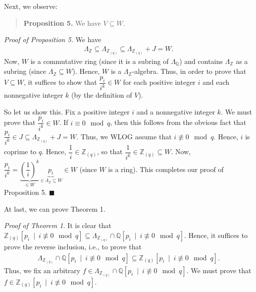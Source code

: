 \documentclass[10pt,a4paper]{article}
\begin{document}
Next, we observe:



\begin{quote}



\textbf{Proposition 5.} We have $V\subseteq W$.



\end{quote}



\emph{Proof of Proposition 5.} We have
\begin{align}
\Lambda
_{\mathbb{Z}}\subseteq \Lambda
_{\mathbb{Z}_{\left(  q\right)  }}\subseteq \Lambda_{\mathbb{Z}_{\left(
q\right)  }}+J=W .
\end{align}
Now, $W$ is a commutative ring (since it is a subring of $\Lambda_{\mathbb{Q}}$) and contains
$\Lambda_{\mathbb{Z}}$ as a subring (since $\Lambda
_{\mathbb{Z}}\subseteq W$). Hence, $W$ is a $\Lambda_{\mathbb{Z}}$-algebra. Thus, in order to prove that $V\subseteq W$, it suffices to show
that $\dfrac{p_{i}}{i^{k}}\in W$ for each positive integer $i$ and each
nonnegative integer $k$ (by the definition of $V$).




So let us show this. Fix a positive integer $i$ and a nonnegative integer $k$. We must prove that $\dfrac{p_{i}}{i^{k}}\in W$. If $i\equiv0\mod q$,
then this follows from the obvious fact that $\dfrac{p_{i}}{i^{k}}\in
J\subseteq\Lambda_{\mathbb{Z}_{\left(  q\right)  }}+J=W$. Thus, we WLOG assume that $i\not \equiv 0\mod q$. Hence, $i$ is coprime to $q$. Hence, $\dfrac{1}{i}\in \mathbb{Z}_{\left(  q\right)  }$, so that $\dfrac{1}{i^{k}}\in\mathbb{Z}_{\left(  q\right)  }\subseteq W$. Now, $\dfrac{p_{i}}{i^{k}} =\underbrace{\left(  \dfrac{1}{i}\right)  ^{k}}_{\in W} \underbrace{p_{i}}_{\in \Lambda_{\mathbb{Z}} \subseteq W}\in W$ (since $W$ is a ring). This completes our proof of Proposition 5.
$\blacksquare$




At last, we can prove Theorem 1.




\emph{Proof of Theorem 1.} It is clear that $\mathbb{Z}_{\left(  q\right)  }\left[ p_{i}\ \mid\ i\not \equiv 0\mod q\right]  \subseteq
\Lambda_{\mathbb{Z}_{\left(  q\right)  }}\cap\mathbb{Q}\left[  p_{i}
\ \mid\ i\not \equiv 0\mod q\right]  $. Hence, it suffices to
prove the reverse inclusion, i.e., to prove that
\begin{align*}
\Lambda_{\mathbb{Z}_{\left(  q\right)  }}\cap\mathbb{Q}\left[  p_{i}
\ \mid\ i\not \equiv 0\mod q\right]  \subseteq \mathbb{Z}_{\left(  q\right)  }\left[ p_{i}\ \mid\ i\not \equiv 0\mod q\right] .
\end{align*}
Thus, we fix an arbitrary $f\in\Lambda_{\mathbb{Z}_{\left(  q\right)  }}
\cap\mathbb{Q}\left[  p_{i}\ \mid\ i\not \equiv 0\mod q\right]
$. We must prove that $f\in \mathbb{Z}_{\left(  q\right)  }\left[ p_{i}\ \mid\ i\not \equiv 0\mod q\right]$.
\end{document}
